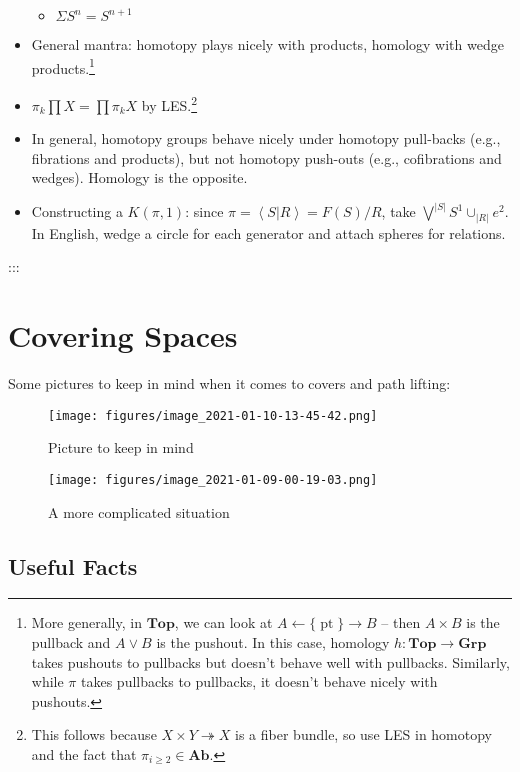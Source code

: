 \begin{itemize}
  \begin{itemize}
  \tightlist
  \item
    \(\Sigma S^n = S^{n+1}\)
  \end{itemize}
\item
  General mantra: homotopy plays nicely with products, homology with
  wedge products.\footnote{More generally, in \(\mathbf{Top}\), we can
    look at \(A \leftarrow{\{\operatorname{pt}\}}\to B\) -- then
    \(A\times B\) is the pullback and \(A \vee B\) is the pushout. In
    this case, homology \(h: \mathbf{Top} \to \mathbf{Grp}\) takes
    pushouts to pullbacks but doesn't behave well with pullbacks.
    Similarly, while \(\pi\) takes pullbacks to pullbacks, it doesn't
    behave nicely with pushouts.}
\item
  \(\pi_{k}\prod X = \prod \pi_{k} X\) by LES.\footnote{This follows
    because \(X\times Y \twoheadrightarrow X\) is a fiber bundle, so use
    LES in homotopy and the fact that \(\pi_{i\geq 2} \in \mathbf{Ab}\).}
\item
  In general, homotopy groups behave nicely under homotopy pull-backs
  (e.g., fibrations and products), but not homotopy push-outs (e.g.,
  cofibrations and wedges). Homology is the opposite.
\item
  Constructing a \(K(\pi, 1)\): since
  \(\pi = \left< S \mathrel{\Big|}R\right> = F(S)/R\), take
  \(\bigvee^{|S|} S^1 \cup_{|R|} e^2\). In English, wedge a circle for
  each generator and attach spheres for relations.
\end{itemize}

:::

\hypertarget{covering-spaces}{%
\section{Covering Spaces}\label{covering-spaces}}

Some pictures to keep in mind when it comes to covers and path lifting:

\begin{figure}
\centering
\texttt{[image: figures/image\_2021-01-10-13-45-42.png]}
\caption{Picture to keep in mind}
\end{figure}

\begin{figure}
\centering
\texttt{[image: figures/image\_2021-01-09-00-19-03.png]}
\caption{A more complicated situation}
\end{figure}

\hypertarget{useful-facts}{%
\subsection{Useful Facts}\label{useful-facts}}


